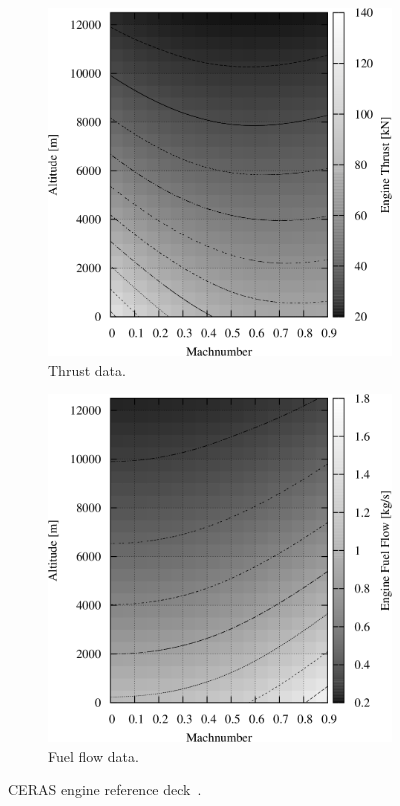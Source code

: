 \begin{figure}[!h]
	\centering
	\begin{subfigure}{0.45\textwidth}
		\includegraphics[keepaspectratio, width=\textwidth]{images/chap2/deck_thrust.png}
		\caption{Thrust data.}
		\label{subfig:ceras_thrust}	
	\end{subfigure}
	\begin{subfigure}{0.45\textwidth}
		\includegraphics[keepaspectratio, width=\textwidth]{images/chap2/deck_ff.png}
		\caption{Fuel flow data.}
		\label{subfig:ceras_ff}	
	\end{subfigure}
	\caption{CERAS engine reference deck~\cite{bib:ceras}.}
	\label{fig:ceras_engine_deck}
\end{figure}

